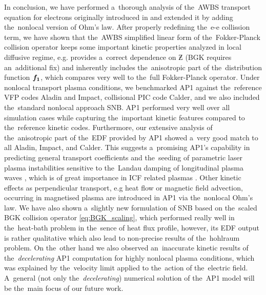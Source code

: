 In conclusion, we have performed a~thorough analysis of the~AWBS transport 
equation for electrons originally introduced in \cite{Sorbo_2015} and extended
it by adding the~nonlocal version of Ohm's law.
After properly redefining the~e-e collission term, we have shown that the~AWBS
simplified linear form of the~Fokker-Planck collision operator keeps
some important kinetic properties analyzed in local diffusive regime, 
e.g. provides a~correct dependence 
on $\Zbar$ (BGK requires an~additional fix) and inherently includes
the~anisotropic part of the~distribution function ${\boldsymbol{f_1}}$, which compares
very well to the~full Fokker-Planck operator.
Under nonlocal transport plasma conditions, we benchmarked AP1 against 
the~reference VFP codes Aladin and Impact, collisional PIC code Calder, 
and we also included the~standard nonlocal approach SNB.
AP1 performed very well over all simulation cases while capturing the~important
kinetic features compared to the~reference kinetic codes. 
Furthermore, our extensive analysis of the~anisotropic part of the~EDF 
provided by AP1 showed a~very good match to all Aladin, Impact, and Calder. 
This suggests 
a~promising AP1's capability in predicting general transport coefficients and 
the~seeding of parametric laser plasma instabilities sensitive 
to the~Landau damping of longitudinal plasma waves 
\cite{goldston1995introduction, Sorbo_2015},
which is of great importance in ICF related plasmas 
\cite{Kirkwood_NIFLPI_PPCF2013}.
Other kinetic effects as perpendicular transport, e.g heat flow
or magnetic field advection, occurring in magnetised plasma  
\cite{Walsh_Nernst_PRL2017} are introduced in
AP1 via the~nonlocal Ohm's law. 
We have also shown a~slightly new formulation of SNB based on
the~scaled BGK collision operator \eqref{eq:BGK_scaling}, which performed
really well in the~heat-bath problem in the~sence of heat flux profile, 
however, its EDF output is rather qualitative which also lead to 
non-precise results of the~hohlraum problem.
On the~other hand we also observed an~inaccurate kinetic results of 
the~\textit{decelerating} AP1 computation for highly nonlocal plasma 
conditions, which was explained by the~velocity limit applied to the~action
of the~electric field. A~general (not only the~\textit{decelerating}) numerical
solution of the~AP1 model
will be the~main focus of our future work.
